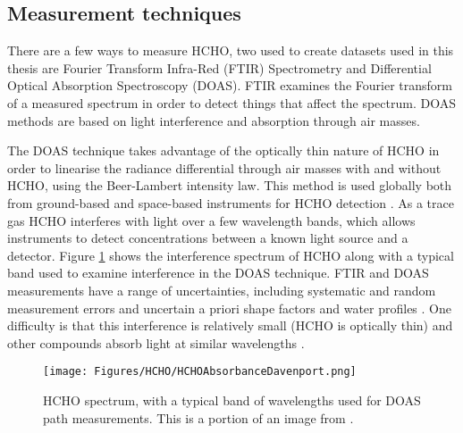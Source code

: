     
  \subsection{Measurement techniques}
    \label{LR:HCHO:Measurements}
    There are a few ways to measure HCHO, two used to create datasets used in this thesis are Fourier Transform Infra-Red (FTIR) Spectrometry and Differential Optical Absorption Spectroscopy (DOAS).
    FTIR examines the Fourier transform of a measured spectrum in order to detect things that affect the spectrum.
    DOAS methods are based on light interference and absorption through air masses.
    
    The DOAS technique takes advantage of the optically thin nature of HCHO in order to linearise the radiance differential through air masses with and without HCHO, using the Beer-Lambert intensity law.
    This method is used globally both from ground-based and space-based instruments for HCHO detection \parencite{Guenther1995, Abad2015, Davenport2015}.
    As a trace gas HCHO interferes with light over a few wavelength bands, which allows instruments to detect concentrations between a known light source and a detector.
    Figure \ref{LR:HCHO:Measurements:fig_HCHOSpectrum} shows the interference spectrum of HCHO along with a typical band used to examine interference in the DOAS technique.
    FTIR and DOAS measurements have a range of uncertainties, including systematic and random measurement errors and uncertain a priori shape factors and water profiles \parencite[e.g.][]{Franco2015}.
    One difficulty is that this interference is relatively small (HCHO is optically thin) and other compounds absorb light at similar wavelengths \parencite{Davenport2015}.
    
    \begin{figure}
      \texttt{[image: Figures/HCHO/HCHOAbsorbanceDavenport.png]}
      \caption{ %
        HCHO spectrum, with a typical band of wavelengths used for DOAS path measurements.
        This is a portion of an image from \textcite{Davenport2015}.}
      \label{LR:HCHO:Measurements:fig_HCHOSpectrum}
    \end{figure}
    
